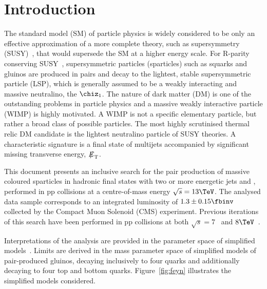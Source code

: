 \section{Introduction}
\label{sec:introduction}

The standard model (SM) of particle physics is widely considered to be
only an effective approximation of a more complete theory, such as
supersymmetry (SUSY)~\cite{ref:SUSY-1,ref:SUSY0,ref:SUSY1,ref:SUSY2,ref:SUSY3,ref:SUSY4,ref:hierarchy1,ref:hierarchy2},
that would supersede the SM at a higher energy scale. For R-parity conserving
SUSY~\cite{Farrar:1978xj}, supersymmetric particles (sparticles) such
as squarks and gluinos are produced in pairs and decay to the
lightest, stable supersymmetric particle (LSP), which is generally
assumed to be a weakly interacting and massive neutralino, the $\chiz_1$. 
The nature of dark matter (DM) is one of the outstanding problems in particle physics and a massive weakly interactive particle (WIMP) is highly motivated. A WIMP is not a specific elementary particle, but rather a broad class of possible particles. The most highly scrutinised thermal relic DM candidate is the lightest neutralino particle of SUSY theories.
A characteristic signature is a final state of multijets accompanied by
significant missing transverse energy, $\met$.

This document presents an inclusive search for the pair production of
massive coloured sparticles in hadronic final states with two or more
energetic jets and \met, performed in pp collisions at a
centre-of-mass energy $\sqrt{s} = 13\TeV$. The analysed data sample
corresponds to an integrated luminosity of $1.3 \pm 0.15 \fbinv$~\cite{lumi} collected by the Compact Muon Solenoid (CMS)
experiment. Previous iterations of this search have been performed in
pp collisions at both $\sqrt{s} = 7$~\cite{RA1Paper, RA1Paper2011, RA1Paper2011FULL} and $8\TeV$~\cite{RA1Paper2012}.

Interpretations of the analysis are provided in the parameter space of simplified models~\cite{Alwall:2008ag, Alwall:2008va, sms}. Limits are derived in the mass parameter space of simplified models of pair-produced gluinos, decaying inclusively to four quarks and additionally decaying to four top and bottom quarks. Figure~\ref{fig:feyn} illustrates the simplified models considered.

